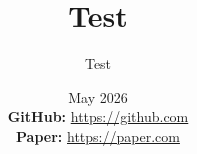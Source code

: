 \documentclass{beamer}
\title{Test}
\author{Test}
\date{May 2026 \\ \vspace{1em} \footnotesize \textbf{GitHub:} \url{https://github.com} \\ \textbf{Paper:} \url{https://paper.com} }
\begin{document}
\frame{\titlepage}
\end{document}
